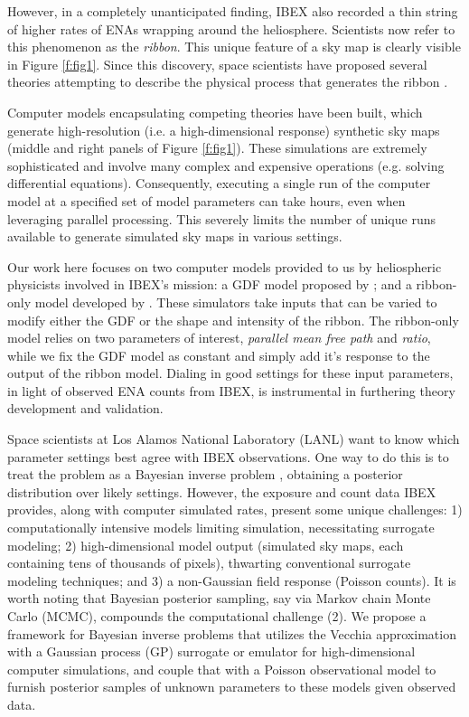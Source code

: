 \documentclass[11pt]{article}
\begin{document}
However, in a completely unanticipated finding, IBEX also recorded a thin
string of higher rates of ENAs \citep{fuselier2009IBEXribbon} wrapping around
the heliosphere. Scientists now refer to this phenomenon as the
\textit{ribbon}. This unique feature of a sky map is clearly visible in Figure
\ref{f:fig1}. Since this discovery, space scientists have proposed several
theories attempting to describe the physical process that generates the ribbon
\citep{mccomas2014ibex, zirnstein2018role, zirnstein2019strong,
zirnstein2021dependence}.

Computer models encapsulating competing theories have been built, which generate
high-resolution (i.e. a high-dimensional response) synthetic sky maps (middle
and right panels of Figure \ref{f:fig1}). These simulations are extremely
sophisticated and involve many complex and expensive operations (e.g. solving
differential equations). Consequently, executing a single run of the computer
model at a specified set of model parameters can take hours, even when
leveraging parallel processing. This severely limits the number of unique runs
available to generate simulated sky maps in various settings.

Our work here focuses on two computer models provided to us by heliospheric
physicists involved in IBEX's mission: a GDF model proposed by
\citet{zirnstein2021heliosheath,zirnstein2025global,swaczyna2020density}; and a
ribbon-only model developed by \citet{huang2025numerical}. These simulators
take inputs that can be varied to modify either the GDF or the shape and
intensity of the ribbon. The ribbon-only model relies on two parameters of
interest, \textit{parallel mean free path} and \textit{ratio}, while we fix the
GDF model as constant and simply add it's response to the output of the ribbon
model. Dialing in good settings for these input parameters, in light of
observed ENA counts from IBEX, is instrumental in furthering theory development
and validation.

Space scientists at Los Alamos National Laboratory (LANL) want to know which
parameter settings best agree with IBEX observations. One way to do this is to
treat the problem as a Bayesian inverse problem
\citep{kaipio2011bayesian,stuart2010inverse,knapik2011bayesian}, obtaining a
posterior distribution over likely settings.  However, the exposure and count
data IBEX provides, along with computer simulated rates, present some unique
challenges: 1) computationally intensive models limiting simulation,
necessitating surrogate modeling; 2) high-dimensional model output (simulated
sky maps, each containing tens of thousands of pixels), thwarting conventional
surrogate modeling techniques; and 3) a non-Gaussian field response (Poisson
counts). It is worth noting that Bayesian posterior sampling, say via Markov
chain Monte Carlo (MCMC), compounds {\color{red}the computational challenge}
(2). We propose a framework for Bayesian inverse problems that utilizes the
Vecchia approximation \citep{katzfuss2021general,scaledvecchiakatzfuss2022}
with a Gaussian process (GP) surrogate or emulator for high-dimensional
computer simulations, and couple that with a Poisson observational model to
furnish posterior samples of unknown parameters to these models given observed
data.
\end{document}
